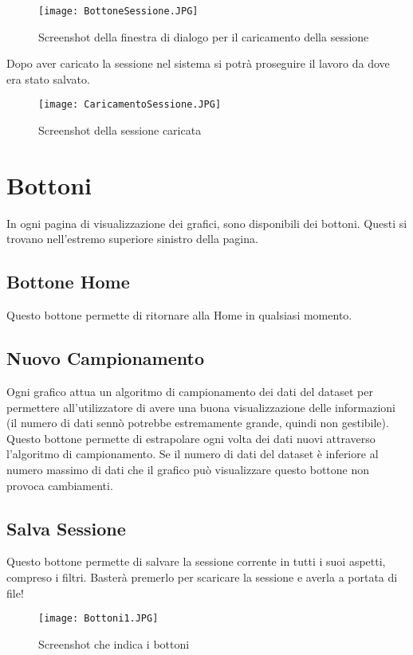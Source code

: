 \begin{figure}[H]
    \texttt{[image: BottoneSessione.JPG]}
    \caption{Screenshot della finestra di dialogo per il caricamento della sessione}
\end{figure}

Dopo aver caricato la sessione nel sistema si potrà proseguire il lavoro da dove era stato salvato.

\begin{figure}[H]
    \texttt{[image: CaricamentoSessione.JPG]}
    \caption{Screenshot della sessione caricata}
\end{figure}

\section{Bottoni}
In ogni pagina di visualizzazione dei grafici, sono disponibili dei bottoni. Questi si trovano nell'estremo superiore sinistro della pagina.

\subsection{Bottone Home}
Questo bottone permette di ritornare alla Home in qualsiasi momento.

\subsection{Nuovo Campionamento}
Ogni grafico attua un algoritmo di campionamento dei dati del dataset per permettere all'utilizzatore di avere una buona visualizzazione delle informazioni (il numero di dati sennò potrebbe estremamente grande, quindi non gestibile).
Questo bottone permette di estrapolare ogni volta dei dati nuovi attraverso l'algoritmo di campionamento. Se il numero di dati del dataset è inferiore al numero massimo di dati che il grafico può visualizzare questo bottone non provoca cambiamenti.

\subsection{Salva Sessione}
Questo bottone permette di salvare la sessione corrente in tutti i suoi aspetti, compreso i filtri. Basterà premerlo per scaricare la sessione e averla a portata di file!

\begin{figure}[H]
    \texttt{[image: Bottoni1.JPG]}
    \caption{Screenshot che indica i bottoni}
\end{figure}


